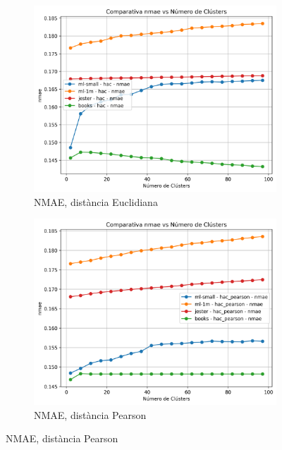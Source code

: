 \documentclass[a4paper,12pt]{report}
\begin{document}
\begin{figure}[H]
    \centering
    \begin{subfigure}[b]{0.49\textwidth}
        \includegraphics[width=\textwidth]{Figuras/nmae-hac-all.png}
        \caption{NMAE, distància Euclidiana}
        \label{fig:hac-clustering-results-a}
    \end{subfigure}
    \hfill
    \begin{subfigure}[b]{0.49\textwidth}
        \includegraphics[width=\textwidth]{Figuras/nmae-hac_pearson-all.png}
        \caption{NMAE, distància Pearson}
        \label{fig:hac-clustering-results-b}
    \end{subfigure}


\end{figure}
\end{document}
